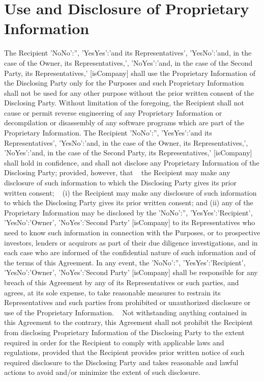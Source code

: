 \documentclass[12pt]{article}
\newcommand{\VAR}[1]{{\color{blue}#1}}
\newcommand{\BLOCK}[1]{~\newline{ \color{red}#1 }}
\newcommand{\representativesMention}[1]{
    \VAR{
        {
            'NoNo':'',
            'YesYes':'#1 its Representatives',
            'YesNo':'#1, in the case of the Owner, its Representatives,',
            'NoYes':'#1, in the case of the Second Party, its Representatives,'
        }[isCompany]
    }
}
\newcommand{\representedParty}{
    \VAR{
        {
            'NoNo':'',
            'YesYes':'Recipient',
            'YesNo':'Owner',
            'NoYes':'Second Party'
        }[isCompany]
    }
}
\begin{document}
\section{Use and Disclosure of Proprietary Information} \label{sec:discl}
The Recipient \representativesMention{and} shall use the Proprietary Information of the Disclosing Party only for the Purposes and such Proprietary Information shall not be used for any other purpose without the prior written consent of the Disclosing Party. Without limitation of the foregoing, the Recipient shall not cause or permit reverse engineering of any Proprietary Information or decompilation or disassembly of any software programs which are part of the Proprietary Information.
The Recipient \representativesMention{and} shall hold in confidence, and shall not disclose any Proprietary Information of the Disclosing Party; provided, however, that
\BLOCK{ if isCompany == 'NoNo' }
the Recipient may make any disclosure of such information to which the Disclosing Party gives its prior written consent;
\BLOCK{ else }
(i) the Recipient may make any disclosure of such information to which the Disclosing Party gives its prior written consent; and (ii) any of the Proprietary Information may be disclosed by the \representedParty to its Representatives who need to know such information in connection with the Purposes, or to prospective investors, lenders or acquirors as part of their due diligence investigations, and in each case who are informed of the confidential nature of such information and of the terms of this Agreement. In any event, the \representedParty shall be responsible for any breach of this Agreement by any of its Representatives or such parties, and agrees, at its sole expense, to take reasonable measures to restrain its Representatives and such parties from prohibited or unauthorized disclosure or use of the Proprietary Information.
\BLOCK{ endif }
Not withstanding anything contained in this Agreement to the contrary, this Agreement shall not prohibit the Recipient from disclosing Proprietary Information of the Disclosing Party to the extent required in order for the Recipient to comply with applicable laws and regulations, provided that the Recipient provides prior written notice of such required disclosure to the Disclosing Party and takes reasonable and lawful actions to avoid and/or minimize the extent of such disclosure.
\end{document}

